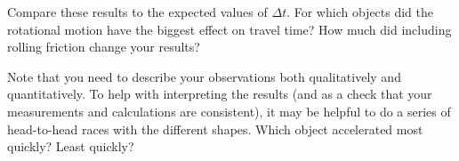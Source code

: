\documentclass[11pt,letterpaper]{article}
\begin{document}
Compare these results to the expected values of $\Delta{t}$. For which objects did the rotational motion have the biggest effect on travel time? How much did including rolling friction change your results?

Note that you need to describe your observations both qualitatively and quantitatively. To help with interpreting the results (and as a check that your measurements and calculations are consistent), it may be helpful to do a series of head-to-head races with the different shapes. Which object accelerated most quickly? Least quickly?





\clearpage
\null
\end{document}
